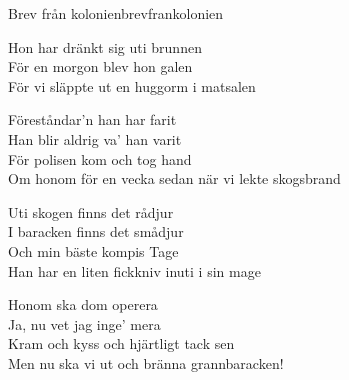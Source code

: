 \begin{song}{Brev från kolonien}{brevfrankolonien}
\begin{vers}
Hon har dränkt sig uti brunnen\\
För en morgon blev hon galen\\
För vi släppte ut en huggorm i matsalen\\
\end{vers}
\begin{vers}
Föreståndar'n han har farit\\
Han blir aldrig va' han varit\\
För polisen kom och tog hand\\
Om honom för en vecka sedan när vi lekte skogsbrand\\
\end{vers}
\begin{vers}
Uti skogen finns det rådjur\\
I baracken finns det smådjur\\
Och min bäste kompis Tage\\
Han har en liten fickkniv inuti i sin mage\\
\end{vers}
\begin{vers}
Honom ska dom operera\\
Ja, nu vet jag inge' mera\\
Kram och kyss och hjärtligt tack sen\\
Men nu ska vi ut och bränna grannbaracken!\\
\end{vers}
\end{song}
